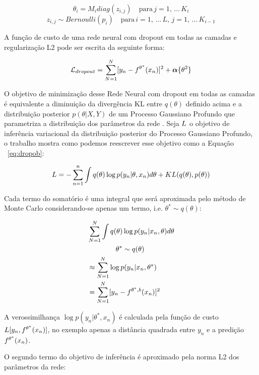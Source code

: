 \newcommand{\diag}{\mathop{\mathrm{diag}}}

\[
  \theta_i   = M_i   diag (z_{i,j}) \quad \text{para} \, j=1, \, \dots  \,K_i
\] 
\[
  z_{i,j}  \sim Bernoulli(p_i) \quad  \text{para} \, i=1, \, \dots \, L, \, j=1, \, \dots \, K_{i-1}
\]   


A função de custo de uma rede neural com dropout em todas as camadas  e
regularização L2 pode ser escrita da seguinte forma:

\begin{equation}
  \mathcal{L}_{dropout} = \sum^N_{N=1} [y_n - \mathnormal{f}^{\theta^*}(x_n)]^2
  + \boldsymbol{\alpha}\{\theta^2\}
\label{eq:dropob}
\end{equation}


O objetivo de minimização desse Rede Neural com dropout em todas as camadas é
equivalente a diminuição da divergência KL entre $q(\theta)$ definido acima e a distribuição
posterior $p(\theta | X,Y)$ de um Processo Gaussiano Profundo que parametriza a
distribuição dos parâmetros da rede \citep{dropbayes}. Seja $\mathnormal{L}$ o
objetivo de inferência variacional da distribuição posterior do Processo Gaussiano Profundo, o trabalho
\citep{dropbayes} mostra como podemos reescrever esse objetivo como a Equação ~\ref{eq:dropob}:

\[
    \mathnormal{L} = - \sum^n_{n=1}\int{q(\theta)  \log p(y_n | \theta,x_n)}d\theta + \mathnormal{KL}(q(\theta),p(\theta))
\]


Cada termo do somatório é uma integral que será aproximada pelo método de Monte Carlo 
considerando-se apenas um termo, i.e. $\theta^* \sim q(\theta)$:

\begin{align*}
                    &\sum^N_{N=1} \int q(\theta) \log p(y_n | x_n,\theta)d\theta \\ 
                    &\qquad \qquad  \theta^* \sim q(\theta) \\
                    &\approx \sum^N_{N=1} \log p(y_n | x_n,\theta^*) \\
                    &= \sum^N_{N=1} [y_n - \mathnormal{f}^{\theta^*,b}(x_n)]^2
\end{align*}

A verossimilhança $\log p(y_n | \theta^*,x_n)$ é calculada pela
função de custo $L[y_n,\mathnormal{f}^{\theta^*}(x_n)]$, no exemplo apenas a distância quadrada
entre $y_n$ e a predição $\mathnormal{f}^{\theta^*}(x_n)$.

O segundo termo do objetivo de inferência é aproximado pela norma L2 dos
parâmetros da rede:

